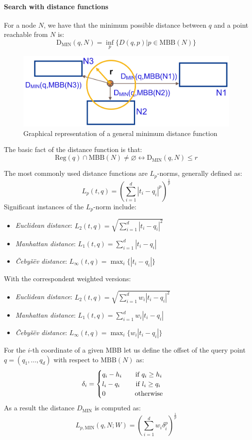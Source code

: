 \paragraph*{Search with distance functions}
For a node $N$, we have that the minimum possible distance between $q$ and a point reachable from $N$ is: 
\[\text{D}_{\text{MIN}}(q,N)=\inf_p\{D(q,p)|p \in \text{MBB}(N)\}\]
\begin{figure}[H]
    \centering
    \includegraphics[width=0.5\linewidth]{images/d.png}
    \caption{Graphical representation of a general minimum distance function}
\end{figure}
The basic fact of the distance function is that: 
\[\text{Reg}(q) \cap \text{MBB}(N) \neq \varnothing \leftrightarrow \text{D}_{\text{MIN}}(q,N) \leq r\]

The most commonly used distance functions are $L_p$-norms, generally defined as: 
\[L_p(t,q)=\left( \sum_{i=1}^d \left\lvert t_i-q_i \right\rvert^p  \right)^{\frac{1}{p}}\]
Significant instances of the $L_p$-norm include:
\begin{itemize}
    \item \textit{Euclidean distance}: $L_2(t,q)=\sqrt{\sum_{i=1}^{d}{\left\lvert t_i-q_i \right\rvert^{2}}}$
    \item \textit{Manhattan distance}: $L_1(t,q)=\sum_{i=1}^{d}{\left\lvert t_i-q_i \right\rvert}$
    \item \textit{Čebyšëv distance}: $L_{\infty}(t,q)=\max_{i}\{\left\lvert t_i-q_i\right\rvert\}$
\end{itemize}
With the correspondent weighted versions: 
\begin{itemize}
    \item \textit{Euclidean distance}: $L_2(t,q)=\sqrt{\sum_{i=1}^{d}{w_i\left\lvert t_i-q_i \right\rvert^{2}}}$
    \item \textit{Manhattan distance}: $L_1(t,q)=\sum_{i=1}^{d}{w_i\left\lvert t_i-q_i \right\rvert}$
    \item \textit{Čebyšëv distance}: $L_{\infty}(t,q)=\max_{i}\{w_i\left\lvert t_i-q_i\right\rvert\}$
\end{itemize}

For the $i$-th coordinate of a given MBB let us define the offset of the query point $q=(q_1,\dots,q_d)$ with respect to $\text{MBB}(N)$ as:
\[ \delta_i=\begin{cases}
    q_i-h_i \qquad \textnormal{if } q_i \geq h_i \\
    l_i-q_i \qquad \textnormal{ if } l_i \geq q_i \\
    0 \qquad\qquad \textnormal{  otherwise}
\end{cases}\]
As a result the distance $D_{\text{MIN}}$ is computed as:
\[L_{p,\text{MIN}}(q,N;W)=\left( \sum_{i=1}^d{w_i\delta_i^p} \right)^{\frac{1}{p}}\]

